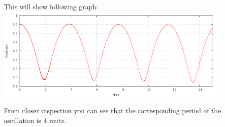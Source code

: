 \documentclass[10pt]{beamer}
\begin{document}


\begin{frame}
This will show following graph:\\

\centering
 \includegraphics[width=11.5cm]{fig/period}

From closer inspection you can see that the corresponding period of the oscillation is 4 units.

\end{frame}



\end{document}
